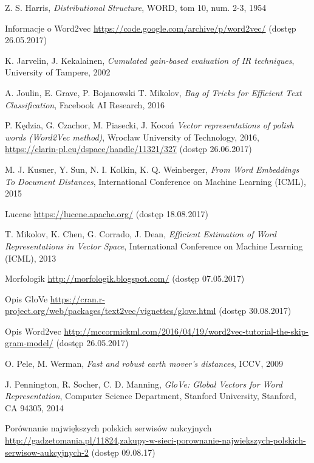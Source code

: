 \documentclass[pl]{minipw} %
\begin{document}
\begin{thebibliography}{30}
		Z. S. Harris,
		\emph{Distributional Structure},
		WORD, tom 10, num. 2-3,
		1954
	
		Informacje o Word2vec
		\url{https://code.google.com/archive/p/word2vec/}
		(dostęp 26.05.2017)
	
		K. Jarvelin, J. Kekalainen,
		\emph{Cumulated gain-based evaluation of IR techniques},
		University of Tampere,
		2002
	
		A. Joulin, E. Grave, P. Bojanowski T. Mikolov,
		\emph{Bag of Tricks for Efficient Text Classification},
		Facebook AI Research,
		2016
	
		P. Kędzia, G. Czachor, M. Piasecki, J. Kocoń
		\emph{Vector representations of polish words (Word2Vec method)},
		Wrocław University of Technology,
		2016,
		\url{https://clarin-pl.eu/dspace/handle/11321/327}
		(dostęp 26.06.2017)
	
		M. J. Kusner, Y. Sun, N. I. Kolkin, K. Q. Weinberger,
		\emph{From Word Embeddings To Document Distances},
		International Conference on Machine Learning (ICML),
		2015
	
		Lucene
		\url{https://lucene.apache.org/}
		(dostęp 18.08.2017)
	
		T. Mikolov, K. Chen, G. Corrado, J. Dean,
		\emph{Efficient Estimation of Word Representations in Vector Space},
		International Conference on Machine Learning (ICML),
		2013
	
		Morfologik
		\url{http://morfologik.blogspot.com/}
		(dostęp 07.05.2017)
	
		Opis GloVe
		\url{https://cran.r-project.org/web/packages/text2vec/vignettes/glove.html}
		(dostęp 30.08.2017)
	
		Opis Word2vec
		\url{http://mccormickml.com/2016/04/19/word2vec-tutorial-the-skip-gram-model/}
		(dostęp 26.05.2017)
	
		O. Pele, M. Werman,
		\emph{Fast and robust earth mover's distances},
		ICCV,
		2009
	
		J. Pennington, R. Socher, C. D. Manning,
		\emph{GloVe: Global Vectors for Word Representation},
		Computer Science Department, Stanford University, Stanford, CA 94305,
		2014
	
		Porównanie największych polskich serwisów aukcyjnych
		\url{http://gadzetomania.pl/11824,zakupy-w-sieci-porownanie-najwiekszych-polskich-serwisow-aukcyjnych-2}
		(dostęp 09.08.17)
	

\end{thebibliography}
\end{document}
